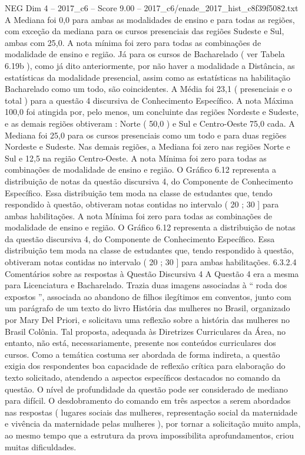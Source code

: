 \begin{textsample}{NEG Dim 4 – 2017\_c6 – Score 9.00 – 2017\_c6/enade\_2017\_hist\_c8f39f5082.txt}
A Mediana foi 0,0 para ambas as modalidades de ensino e para todas as regiões, com exceção da mediana para os cursos presenciais das regiões Sudeste e Sul, ambas com 25,0.
A nota mínima foi zero para todas as combinações de modalidade de ensino e região.
Já para os cursos de Bacharelado ( ver Tabela 6.19b ), como já dito anteriormente, por não haver a modalidade a Distância, as estatísticas da modalidade presencial, assim como as estatísticas na habilitação Bacharelado como um todo, são coincidentes.
A Média foi 23,1 ( presenciais e o total ) para a questão 4 discursiva de Conhecimento Específico.
A nota Máxima 100,0 foi atingida por, pelo menos, um concluinte das regiões Nordeste e Sudeste, e as demais regiões obtiveram : Norte ( 50,0 ) e Sul e Centro-Oeste 75,0 cada.
A Mediana foi 25,0 para os cursos presenciais como um todo e para duas regiões Nordeste e Sudeste.
Nas demais regiões, a Mediana foi zero nas regiões Norte e Sul e 12,5 na região Centro-Oeste.
A nota Mínima foi zero para todas as combinações de modalidade de ensino e região.
O Gráfico 6.12 representa a distribuição de notas da questão discursiva 4, do Componente de Conhecimento Específico.
Essa distribuição tem moda na classe de estudantes que, tendo respondido à questão, obtiveram notas contidas no intervalo ( 20 ; 30 ] para ambas habilitações.
A nota Mínima foi zero para todas as combinações de modalidade de ensino e região.
O Gráfico 6.12 representa a distribuição de notas da questão discursiva 4, do Componente de Conhecimento Específico.
Essa distribuição tem moda na classe de estudantes que, tendo respondido à questão, obtiveram notas contidas no intervalo ( 20 ; 30 ] para ambas habilitações. 6.3.2.4 Comentários sobre as respostas à Questão Discursiva 4 A Questão 4 era a mesma para Licenciatura e Bacharelado.
Trazia duas imagens associadas à “ roda dos expostos ”, associada ao abandono de filhos ilegítimos em conventos, junto com um parágrafo de um texto do livro História das mulheres no Brasil, organizado por Mary Del Priori, e solicitava uma reflexão sobre a história das mulheres no Brasil Colônia.
Tal proposta, adequada às Diretrizes Curriculares da Área, no entanto, não está, necessariamente, presente nos conteúdos curriculares dos cursos.
Como a temática costuma ser abordada de forma indireta, a questão exigia dos respondentes boa capacidade de reflexão crítica para elaboração do texto solicitado, atendendo a aspectos específicos destacados no comando da questão.
O nível de profundidade da questão pode ser considerado de mediano para difícil.
O desdobramento do comando em três aspectos a serem abordados nas respostas ( lugares sociais das mulheres, representação social da maternidade e vivência da maternidade pelas mulheres ), por tornar a solicitação muito ampla, ao mesmo tempo que a estrutura da prova impossibilita aprofundamentos, criou muitas dificuldades.

\end{textsample}
